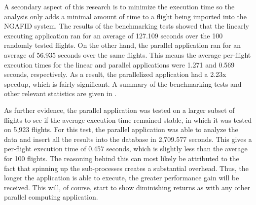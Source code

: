 	A secondary aspect of this research is to minimize the execution time so the analysis only adds a minimal amount of time to a flight being imported into the NGAFID system.  The results of the benchmarking tests showed that the linearly executing application ran for an average of 127.109 seconds over the 100 randomly tested flights.  On the other hand, the parallel application ran for an average of 56.935 seconds over the same flights.  This means the average per-flight execution times for the linear and parallel applications were 1.271 and 0.569 seconds, respectively.  As a result, the parallelized application had a 2.23x speedup, which is fairly significant.  A summary of the benchmarking tests and other relevant statistics are given in .
    
    As further evidence, the parallel application was tested on a larger subset of flights to see if the average execution time remained stable, in which it was tested on 5,923 flights.  For this test, the parallel application was able to analyze the data and insert all the results into the database in 2,709.577 seconds.  This gives a per-flight execution time of 0.457 seconds, which is slightly less than the average for 100 flights.  The reasoning behind this can most likely be attributed to the fact that spinning up the sub-processes creates a substantial overhead.  Thus, the longer the application is able to execute, the greater performance gain will be received.  This will, of course, start to show diminishing returns as with any other parallel computing application.
    

